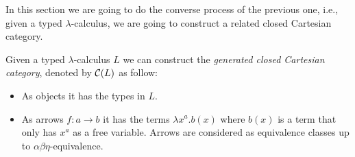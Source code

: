 In this section we are going to do the converse process of the previous one, i.e., given a typed $\lambda$-calculus, we are going to construct a related closed Cartesian category.

\begin{definition}
  Given a typed $\lambda$-calculus $L$ we can construct the \emph{generated closed Cartesian category}, denoted by $\mathcal{C} (L)$ as follow:
  \begin{itemize}
  \item As objects it has the types in $L$.
  \item As arrows $f:a\to b$ it has the terms $\lambda x^a. b(x)$ where $b(x)$ is a term that only has $x^a$ as a free variable. Arrows are considered as equivalence classes up to $\alpha\beta\eta$-equivalence.
  \end{itemize}
\end{definition}

